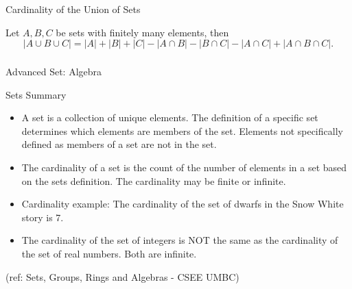 \begin{frame}{Cardinality of the Union of Sets}

\begin{theorem} Let $A,B,C$ be sets with finitely many elements, then
$$|A\cup B \cup C|=|A|+|B|+|C|-|A\cap B|-|B\cap C|-|A\cap C|+|A\cap B \cap C|.$$ 
\end{theorem}
\end{frame}

\begin{frame}[fragile]\frametitle{}
\begin{center}
{\Large Advanced Set: Algebra}
\end{center}
\end{frame}


\begin{frame}{Sets Summary}
\begin{itemize}
\item  A set is a collection of unique elements.
  The definition of a specific set determines which elements
  are members of the set.
  Elements not specifically defined as members of a set are not
  in the set.

\item The cardinality of a set is the count of the number of elements
  in a set based on the sets definition. The cardinality may be
  finite or infinite.

\item Cardinality example: The cardinality of the set of dwarfs in
  the Snow White story is 7.

\item The cardinality of the set of integers is NOT the same as the
  cardinality of the set of real numbers. Both are infinite.
\end{itemize}

\tiny{(ref: Sets, Groups, Rings and Algebras - CSEE UMBC)}

\end{frame}

